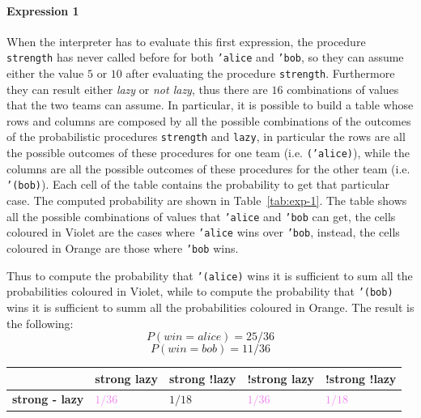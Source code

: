 \begin{itemize}
        \paragraph*{Expression 1} When the interpreter has to evaluate this first expression, the procedure \texttt{strength} has never 
        called before for both \texttt{'alice} and \texttt{'bob}, so they can assume either the value $5$ or $10$ after evaluating
        the procedure \texttt{strength}. Furthermore they can result either \textit{lazy} or \textit{not lazy}, thus there are
        $16$ combinations of values that the two teams can assume.
        In particular, it is possible to build a table whose rows and columns are composed by all the possible combinations of
        the outcomes of the probabilistic procedures \texttt{strength} and \texttt{lazy}, in particular
        the rows are all the possible outcomes of these procedures for one team (i.e. \texttt{('alice)}), 
        while the columns are all the possible outcomes of these procedures for the other team (i.e. \texttt{'(bob)}).
        Each cell of the table contains the probability to get that particular case. The computed probability are shown
        in Table~\ref{tab:exp-1}.
        The table shows all the possible combinations of values that \texttt{'alice} and \texttt{'bob} can get, the cells coloured
        in Violet are the cases where \texttt{'alice} wins over \texttt{'bob}, instead, the cells coloured in Orange are those
        where \texttt{'bob} wins.

        Thus to compute the probability that \texttt{'(alice)} wins it is sufficient to sum all the probabilities coloured in Violet,
        while to compute the probability that \texttt{'(bob)} wins it is sufficient to summ all the probabilities coloured in Orange.
        The result is the following:
        \[ P(win = alice) = 25 / 36 \]
        \[ P(win = bob) = 11 / 36 \]
        \begin{table}[H]
            \centering
            \bgroup
                \def\arraystretch{1.5}
                \begin{tabular}{| l | C{1.8cm} C{1.8cm} C{1.8cm} C{1.8cm}  |}
                    \hline
                     & 
                        \textbf{strong lazy} & \textbf{strong !lazy} & \textbf{!strong lazy} & \textbf{!strong !lazy} \\
                    \hline

                    \textbf{strong - lazy} & \textcolor{Violet}{$1/36$} & \textcolor{RedOrange}{$1/18$} & 
                        \textcolor{Violet}{$1/36$} & \textcolor{Violet}{$1/18$} \\ 


\end{tabular}
\end{table}
\end{itemize}
